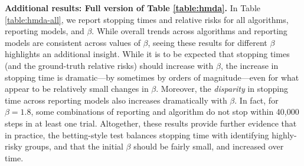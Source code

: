 {\textbf{Additional results: Full version of Table \ref{table:hmda}.} In Table \ref{table:hmda-all}, we report stopping times and relative risks for all algorithms, reporting models, and $\beta$.
While overall trends across algorithms and reporting models are consistent across values of $\beta$, seeing these results for different $\beta$ highlights an additional insight. 
While it is to be expected that stopping times (and the ground-truth relative risks) should increase with $\beta$, the increase in stopping time is dramatic---by sometimes by orders of magnitude---even for what appear to be relatively small changes in $\beta$. Moreover, the \textit{disparity} in stopping time across reporting models also increases dramatically with $\beta$. In fact, for $\beta=1.8$, some combinations of reporting and algorithm do not stop within 40,000 steps in at least one trial. 
Altogether, these results provide further evidence that in practice, the betting-style test balances stopping time with identifying highly-risky groups, and that the initial $\beta$ should be fairly small, and increased over time. 

}
